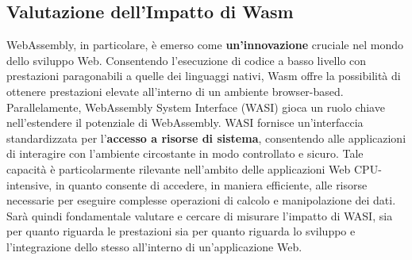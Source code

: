 \subsection{Valutazione dell'Impatto di Wasm}
WebAssembly, in particolare, è emerso come \textbf{un'innovazione} cruciale nel mondo dello sviluppo Web.
Consentendo l'esecuzione di codice a basso livello con prestazioni paragonabili a quelle dei linguaggi nativi, Wasm offre la possibilità di ottenere prestazioni elevate all'interno di un ambiente browser-based.
\\Parallelamente, WebAssembly System Interface (WASI) gioca un ruolo chiave nell'estendere il potenziale di WebAssembly. WASI fornisce un'interfaccia standardizzata per l'\textbf{accesso a risorse di sistema}, consentendo alle applicazioni di interagire con l'ambiente circostante in modo controllato e sicuro. Tale capacità è particolarmente rilevante nell'ambito delle applicazioni Web CPU-intensive, in quanto consente di accedere, in maniera efficiente, alle risorse necessarie per eseguire complesse operazioni di calcolo e manipolazione dei dati.
\\Sarà quindi fondamentale valutare e cercare di misurare l'impatto di WASI, sia per quanto riguarda le prestazioni sia per quanto riguarda lo sviluppo e l'integrazione dello stesso all'interno di un'applicazione Web.


